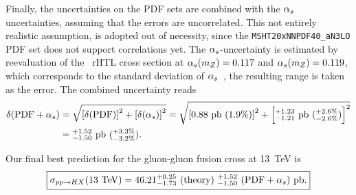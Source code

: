 Finally, the uncertainties on the \acs{PDF} sets are combined with the $\alpha_s$ uncertainties, assuming that the errors are uncorrelated. This not entirely realistic assumption, is adopted out of necessity, since the \texttt{MSHT20xNNPDF40\_aN3LO} \acs{PDF} set does not support correlations yet. The $\alpha_s$-uncertainty is estimated by reevaluation of the \NNNLO\ \acs{rHTL} cross section at $\alpha_s (m_Z) = 0.117$ and $\alpha_s (m_Z) = 0.119$, which corresponds to the standard deviation of $\alpha_s$~\cite{ParticleDataGroup:2022pth}, the resulting range is taken as the error. The combined uncertainty reads
\begin{equation}
\begin{split}
\delta (\text{PDF} + \alpha_s) &= \sqrt{\left[\delta (\text{PDF}) \right]^2 + \left[\delta (\alpha_s)\right]^2} = \sqrt{\left[0.88\ \text{pb}\ (1.9\%) \right]^2 + \left[{}^{+1.23}_{-1.21} \ \text{pb}\ ({}^{+2.6\%}_{-2.6\%}) \right]^2} \\
&= {}^{+1.52}_{-1.50}\ \text{pb} \ ({}^{+3.3\%}_{-3.2\%}).
\end{split}
\end{equation}

Our final best prediction for the gluon-gluon fusion cross at 13~TeV is
\begin{equation}
\boxed{\sigma_{pp \rightarrow HX} (13 \ \mathrm{TeV}) =  46.21^{+0.25}_{-1.73}\ (\text{theory})\ {}^{+1.52}_{-1.50}\ (\text{PDF} + \alpha_s) \ \text{pb}. }
\end{equation}



